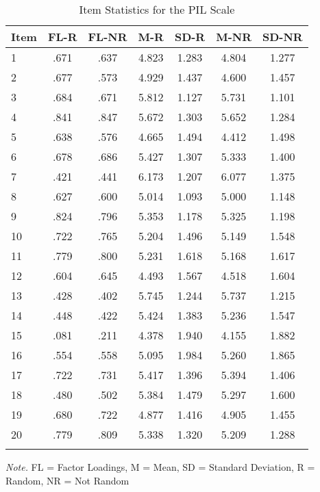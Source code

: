 \documentclass[english,man, mask]{apa6}
\theoremstyle{definition}
\theoremstyle{definition}
\theoremstyle{definition}
\theoremstyle{remark}
\begin{document}
\begin{table}[tbp]
\begin{center}
\begin{threeparttable}
\caption{\label{tab:Ptable}Item Statistics for the PIL Scale}
\begin{tabular}{lcccccc}
\toprule
Item & \multicolumn{1}{c}{FL-R} & \multicolumn{1}{c}{FL-NR} & \multicolumn{1}{c}{M-R} & \multicolumn{1}{c}{SD-R} & \multicolumn{1}{c}{M-NR} & \multicolumn{1}{c}{SD-NR}\\
\midrule
1 & .671 & .637 & 4.823 & 1.283 & 4.804 & 1.277\\
2 & .677 & .573 & 4.929 & 1.437 & 4.600 & 1.457\\
3 & .684 & .671 & 5.812 & 1.127 & 5.731 & 1.101\\
4 & .841 & .847 & 5.672 & 1.303 & 5.652 & 1.284\\
5 & .638 & .576 & 4.665 & 1.494 & 4.412 & 1.498\\
6 & .678 & .686 & 5.427 & 1.307 & 5.333 & 1.400\\
7 & .421 & .441 & 6.173 & 1.207 & 6.077 & 1.375\\
8 & .627 & .600 & 5.014 & 1.093 & 5.000 & 1.148\\
9 & .824 & .796 & 5.353 & 1.178 & 5.325 & 1.198\\
10 & .722 & .765 & 5.204 & 1.496 & 5.149 & 1.548\\
11 & .779 & .800 & 5.231 & 1.618 & 5.168 & 1.617\\
12 & .604 & .645 & 4.493 & 1.567 & 4.518 & 1.604\\
13 & .428 & .402 & 5.745 & 1.244 & 5.737 & 1.215\\
14 & .448 & .422 & 5.424 & 1.383 & 5.236 & 1.547\\
15 & .081 & .211 & 4.378 & 1.940 & 4.155 & 1.882\\
16 & .554 & .558 & 5.095 & 1.984 & 5.260 & 1.865\\
17 & .722 & .731 & 5.417 & 1.396 & 5.394 & 1.406\\
18 & .480 & .502 & 5.384 & 1.479 & 5.297 & 1.600\\
19 & .680 & .722 & 4.877 & 1.416 & 4.905 & 1.455\\
20 & .779 & .809 & 5.338 & 1.320 & 5.209 & 1.288\\
\bottomrule
\addlinespace
\end{tabular}
\begin{tablenotes}[para]
\textit{Note.} FL = Factor Loadings, M = Mean, SD = Standard Deviation, R = Random, NR = Not Random
\end{tablenotes}
\end{threeparttable}
\end{center}
\end{table}
\end{document}
